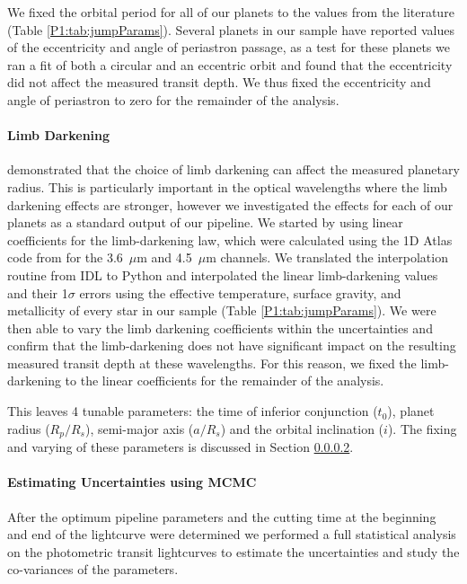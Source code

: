 We fixed the orbital period for all of our planets to the values from the literature (Table \ref{P1:tab:jumpParams}). Several planets in our sample have reported values of the eccentricity and angle of periastron passage, as a test for these planets we ran a fit of both a circular and an eccentric orbit and found that the eccentricity did not affect the measured transit depth. We thus fixed the eccentricity and angle of periastron to zero for the remainder of the analysis.

\paragraph{Limb Darkening}

\citet{Southworth2008} demonstrated that the choice of limb darkening can affect the measured planetary radius. This is particularly important in the optical wavelengths where the limb darkening effects are stronger, however we investigated the effects for each of our planets as a standard output of our pipeline.
We started by using linear coefficients for the limb-darkening law, which were calculated using the 1D Atlas code from \citet{Sing2010} for the 3.6~$\mu$m and 4.5~$\mu$m \spitzer channels. We translated the interpolation routine from IDL to Python and interpolated the linear limb-darkening values and their 1$\sigma$ errors using the effective temperature, surface gravity, and metallicity of every star in our sample (Table \ref{P1:tab:jumpParams}). We were then able to vary the limb darkening coefficients within the uncertainties and confirm that the limb-darkening does not have significant impact on the resulting measured transit depth at these wavelengths. For this reason, we fixed the limb-darkening to the linear coefficients for the remainder of the analysis.

This leaves 4 tunable parameters: the time of inferior conjunction ($t_0$), planet radius ($R_p/R_s$), semi-major axis ($a/R_s$) and the orbital inclination ($i$). The fixing and varying of these parameters is discussed in Section \ref{P1:subsec:fitting}.

\paragraph{Estimating Uncertainties using MCMC}
\label{P1:subsec:fitting}

After the optimum pipeline parameters and the cutting time at the beginning and end of the lightcurve were determined we performed a full statistical analysis on the photometric transit lightcurves to estimate the uncertainties and study the co-variances of the parameters.


